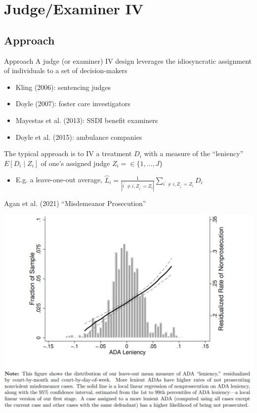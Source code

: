 \documentclass{beamer}
\begin{document}

\section{Judge/Examiner IV}

\subsection{Approach}
\begin{frame}{Approach}
\vspace{-0.2cm}
A judge (or examiner) IV design leverages the idiosyncratic assignment of individuals to a set of decision-makers\smallskip
\begin{itemize}
\item Kling (2006): sentencing judges\smallskip
\item Doyle (2007): foster care investigators\smallskip
\item Mayestas et al. (2013): SSDI benefit examiners\smallskip
\item Doyle et al. (2015): ambulance companies
\end{itemize}\bigskip\pause{}
The typical approach is to IV a treatment $D_i$ with a measure of the ``leniency'' $E[D_i\mid Z_{i}]$ of one's assigned judge $Z_i=\in\{1,\dots,J\}$\smallskip
\begin{itemize}
\item E.g. a leave-one-out average, $\hat{L}_i=\frac{1}{|i^\prime\neq i,Z_{i^\prime}=Z_i|}\sum_{i^\prime \neq i,Z_{i^\prime}=Z_i}D_i$
\end{itemize}
\end{frame}

\begin{frame}{Agan et al. (2021) ``Misdemeanor Prosecution''}
\begin{center}
\includegraphics[scale=0.55]{./lecture_includes/agan_FS.png}
\end{center}
\end{frame}
\end{document}
